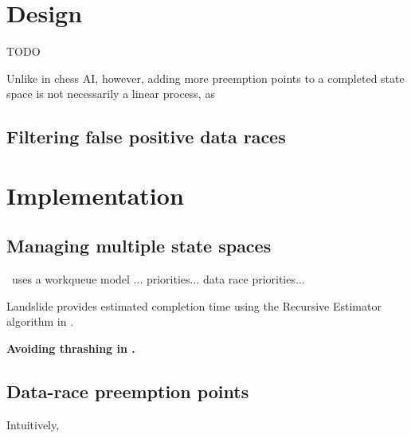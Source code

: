 \section{Design}

TODO

Unlike in chess AI, however, adding more preemption points to a completed state space is not necessarily a linear process, as  %




\subsection{Filtering false positive data races}



\section{Implementation}


\subsection{Managing multiple state spaces}

\quicksand~uses a workqueue model
...
priorities... data race priorities...



Landslide provides estimated completion time using the Recursive Estimator algorithm in \cite{estimation}.

{\bf Avoiding thrashing in \quicksand.} %


\subsection{Data-race preemption points}

Intuitively, %

